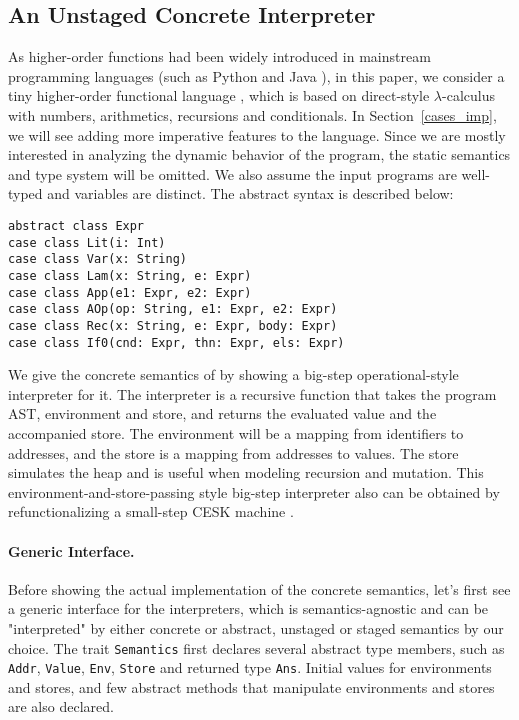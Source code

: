\subsection{An Unstaged Concrete Interpreter} \label{bg_lang}

As higher-order functions had been widely introduced in mainstream programming languages (such as Python and Java ), 
in this paper, we consider a tiny higher-order functional language \TLang, which is based on direct-style $\lambda$-calculus
with numbers, arithmetics, recursions and conditionals.
In Section~\ref{cases_imp}, we will see adding more imperative features to the language.
Since we are mostly interested in analyzing the dynamic behavior of the program, the static semantics and
type system will be omitted. We also assume the input programs are well-typed and variables are distinct.
The abstract syntax is described below:

\begin{lstlisting}
abstract class Expr
case class Lit(i: Int)
case class Var(x: String)
case class Lam(x: String, e: Expr)
case class App(e1: Expr, e2: Expr)
case class AOp(op: String, e1: Expr, e2: Expr)
case class Rec(x: String, e: Expr, body: Expr)
case class If0(cnd: Expr, thn: Expr, els: Expr)
\end{lstlisting}

We give the concrete semantics of \TLang by showing a big-step operational-style interpreter for it.
The interpreter is a recursive function that takes the program AST, environment and store, and returns 
the evaluated value and the accompanied store. The environment will be a mapping from identifiers to addresses,
and the store is a mapping from addresses to values. The store simulates the heap and is useful when modeling 
recursion and mutation.
This environment-and-store-passing style big-step interpreter also can be obtained by 
refunctionalizing \cite{DBLP:conf/ppdp/AgerBDM03, Wei:2018:RAA:3243631.3236800} a small-step CESK 
machine \cite{DBLP:conf/popl/FelleisenF87}.

\paragraph{Generic Interface.} 
Before showing the actual implementation of the concrete semantics, let's first see 
a generic interface for the interpreters, which is semantics-agnostic and can be 
"interpreted" by either concrete or abstract, unstaged or staged semantics by our choice.
The trait \texttt{Semantics} first declares several abstract type members, such as \texttt{Addr},
\texttt{Value}, \texttt{Env}, \texttt{Store} and returned type \texttt{Ans}. 
Initial values for environments and stores, and few abstract methods that manipulate environments and stores are also declared.

